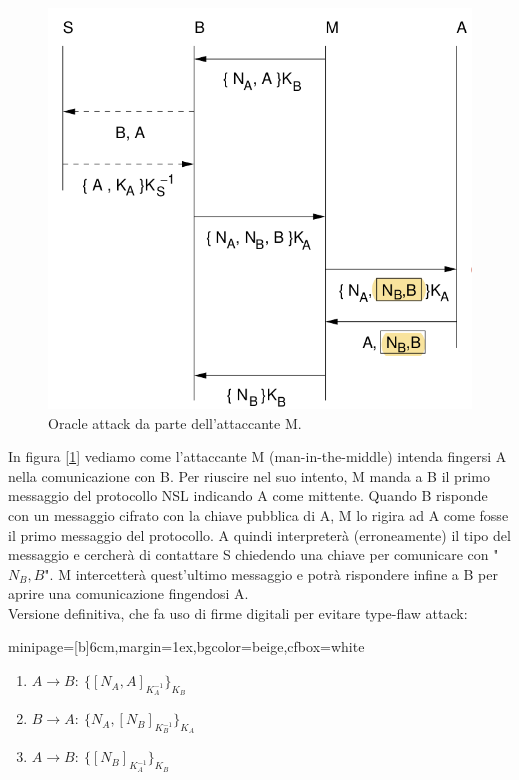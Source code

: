 \documentclass[a4paper, 11pt, twoside, openright, fleqn]{report}
\newcommand{\fromto}[2]{#1\rightarrow #2\!:\ }
\newenvironment{colbox}[2]%
{%
	\par\noindent\hspace{10pt}
	\begin{adjustbox}{minipage=[b]{#2},margin=1ex,bgcolor=#1,cfbox=white}
}{%
	\end{adjustbox}\newline%
}
\begin{document}
\begin{figure}[htp]
	\centering
	\includegraphics[width=.8\textwidth]{images/OracleAttack}
	\caption{Oracle attack da parte dell'attaccante M.}\label{fig:oracle}
\end{figure}
\noindent In figura [\ref{fig:oracle}] vediamo come l'attaccante M (man-in-the-middle) intenda fingersi A nella comunicazione con B. Per riuscire nel suo intento, M manda a B il primo messaggio del protocollo NSL indicando A come mittente. Quando B risponde con un messaggio cifrato con la chiave pubblica di A, M lo rigira ad A come fosse il primo messaggio del protocollo. A quindi interpreterà (erroneamente) il tipo del messaggio e cercherà di contattare S chiedendo una chiave per comunicare con "$N_B,B$". M intercetterà quest'ultimo messaggio e potrà rispondere infine a B per aprire una comunicazione fingendosi A.\\
Versione definitiva, che fa uso di firme digitali per evitare type-flaw attack:
\begin{colbox}{beige}{6cm}
	\begin{enumerate}
		\item $\fromto{A}{B}\{[N_A,A]_{K_A^{-1}}\}_{K_B}$
		\item $\fromto{B}{A}\{N_A,[N_B]_{K_B^{-1}}\}_{K_A}$
		\item $\fromto{A}{B}\{[N_B]_{K_A^{-1}}\}_{K_B}$
	\end{enumerate}
\end{colbox}
\end{document}
